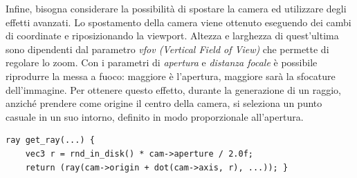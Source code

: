 \documentclass[main.tex]{subfiles}
\begin{document}
Infine, bisogna considerare la possibilità di spostare la camera ed utilizzare degli effetti avanzati. 
Lo spostamento della camera viene ottenuto eseguendo dei cambi di coordinate e riposizionando la viewport. 
Altezza e larghezza di quest'ultima sono dipendenti dal parametro \textit{vfov (Vertical Field of View)} che permette di regolare lo zoom.  
Con i parametri di \textit{apertura} e \textit{distanza focale} è possibile riprodurre la messa a fuoco: maggiore è l'apertura, maggiore sarà la sfocature dell'immagine. Per ottenere questo effetto, durante la generazione di un raggio, anziché prendere come origine il centro della camera, si seleziona un punto casuale in un suo intorno, definito in modo proporzionale all'apertura.
\begin{lstlisting}[style=cppstyle, label=cppexample]
ray get_ray(...) {
    vec3 r = rnd_in_disk() * cam->aperture / 2.0f;
    return (ray(cam->origin + dot(cam->axis, r), ...)); }
\end{lstlisting}
\end{document}
